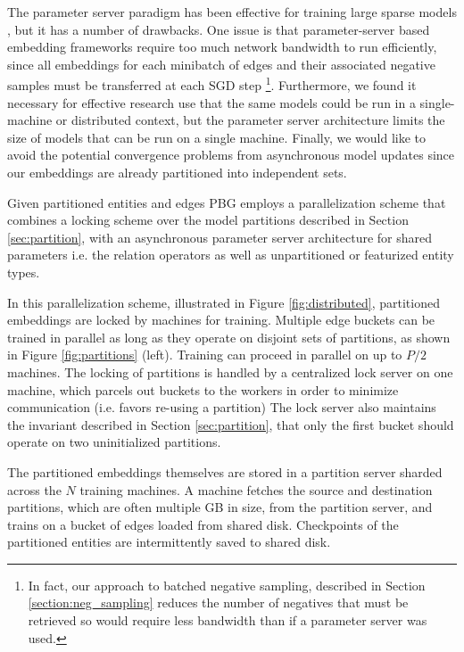 \documentclass{article}
\begin{document}
The parameter server paradigm has been effective for training large sparse models \cite{Li2014}, but it has a number of drawbacks. One issue is that parameter-server based embedding frameworks require too much network bandwidth to run efficiently, since all embeddings for each minibatch of edges and their associated negative samples must be transferred at each SGD step \cite{gridword2vec} \footnote{In fact, our approach to batched negative sampling, described in Section \ref{section:neg_sampling} reduces the number of negatives that must be retrieved so would require less bandwidth than \cite{gridword2vec} if a parameter server was used.}. Furthermore, we found it necessary for effective research use that the same models could be run in a single-machine or distributed context, but the parameter server architecture limits the size of models that can be run on a single machine. Finally, we would like to avoid the potential convergence problems from asynchronous model updates since our embeddings are already partitioned into independent sets.

Given partitioned entities and edges PBG employs a parallelization scheme that combines a locking scheme over the model partitions described in Section \ref{sec:partition}, with an asynchronous parameter server architecture for shared parameters i.e. the relation operators as well as unpartitioned or featurized entity types.

In this parallelization scheme, illustrated in Figure \ref{fig:distributed}, partitioned embeddings are locked by machines for training. Multiple edge buckets can be trained in parallel as long as they operate on disjoint sets of partitions, as shown in Figure \ref{fig:partitions} (left). Training can proceed in parallel on up to $P/2$ machines. The locking of partitions is handled by a centralized lock server on one machine, which parcels out buckets to the workers in order to minimize communication (i.e. favors re-using a partition) The lock server also maintains the invariant described in Section \ref{sec:partition}, that only the first bucket should operate on two uninitialized partitions.

The partitioned embeddings themselves are stored in a partition server sharded across the $N$ training machines. A machine fetches the source and destination partitions, which are often multiple GB in size, from the partition server, and trains on a bucket of edges loaded from shared disk. Checkpoints of the partitioned entities are intermittently saved to shared disk.
\end{document}
